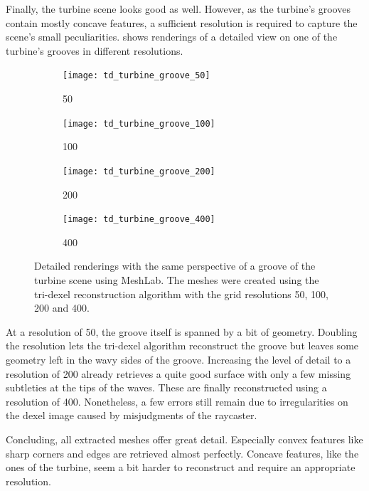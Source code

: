 Finally, the turbine scene looks good as well.
However, as the turbine's grooves contain mostly concave features, a sufficient resolution is required to capture the scene's small peculiarities.
 shows renderings of a detailed view on one of the turbine's grooves in different resolutions.
%
\begin{figure}
	\centering
	\begin{subfigure}[b]{0.24\textwidth}
		\centering
		\texttt{[image: td\_turbine\_groove\_50]}
		\caption{50}
		\label{fig:td_turbine_groove_50}
	\end{subfigure}
	\begin{subfigure}[b]{0.24\textwidth}
		\centering
		\texttt{[image: td\_turbine\_groove\_100]}
		\caption{100}
		\label{fig:td_turbine_groove_100}
	\end{subfigure}
	\begin{subfigure}[b]{0.24\textwidth}
		\centering
		\texttt{[image: td\_turbine\_groove\_200]}
		\caption{200}
		\label{fig:td_turbine_groove_200}
	\end{subfigure}
	\begin{subfigure}[b]{0.24\textwidth}
		\centering
		\texttt{[image: td\_turbine\_groove\_400]}
		\caption{400}
		\label{fig:td_turbine_groove_400}
	\end{subfigure}
	\caption{
		Detailed renderings with the same perspective of a groove of the turbine scene using MeshLab.
		The meshes were created using the tri-dexel reconstruction algorithm with the grid resolutions 50, 100, 200 and 400.
	}
	\label{fig:td_grooves}
\end{figure}
%
At a resolution of 50, the groove itself is spanned by a bit of geometry.
Doubling the resolution lets the tri-dexel algorithm reconstruct the groove but leaves some geometry left in the wavy sides of the groove.
Increasing the level of detail to a resolution of 200 already retrieves a quite good surface with only a few missing subtleties at the tips of the waves.
These are finally reconstructed using a resolution of 400.
Nonetheless, a few errors still remain due to irregularities on the dexel image caused by misjudgments of the raycaster.

Concluding, all extracted meshes offer great detail.
Especially convex features like sharp corners and edges are retrieved almost perfectly.
Concave features, like the ones of the turbine, seem a bit harder to reconstruct and require an appropriate resolution.

